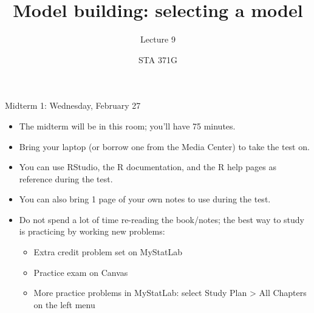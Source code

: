 \documentclass{beamer}\usepackage[]{graphicx}\usepackage[]{color}
\title{Model building: selecting a model}
\subtitle{Lecture 9}
\author{STA 371G}
\begin{document}
  
  

  \frame{\maketitle}



  \begin{darkframes}
    \begin{frame}{Midterm 1: Wednesday, February 27}
      \begin{itemize}[<+->]
        \item The midterm will be in this room; you'll have 75 minutes.
        \item Bring your laptop (or borrow one from the Media Center) to take the test on.
        \item You can use RStudio, the R documentation, and the R help pages as reference during the test.
        \item You can also bring 1 page of your own notes to use during the test.
        \item Do not spend a lot of time re-reading the book/notes; the best way to study is \alert{practicing by working new problems}:
          \begin{itemize}
            \item Extra credit problem set on MyStatLab
            \item Practice exam on Canvas
            \item More practice problems in MyStatLab: select Study Plan > All Chapters on the left menu
          \end{itemize}
      \end{itemize}
    \end{frame}

    \begin{frame}
    \end{frame}


\end{darkframes}
\end{document}
